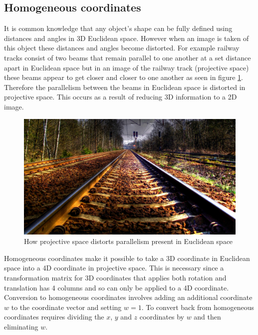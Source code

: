 \subsection{Homogeneous coordinates}
It is common knowledge that any object's shape can be fully defined using distances and angles in 3D Euclidean space. However when an image is taken of this object these distances and angles become distorted. For example railway tracks consist of two beams that remain parallel to one another at a set distance apart in Euclidean space but in an image of the railway track (projective space) these beams appear to get closer and closer to one another as seen in figure \ref{fig:traintrack}. Therefore the parallelism between the beams in Euclidean space is distorted in projective space. This occurs as a result of reducing 3D information to a 2D image. 

\begin{figure}[h]
    \centering
    \includegraphics[scale=0.1]{TrainTrack}
    \caption{How projective space distorts parallelism present in Euclidean space}
    \label{fig:traintrack}
\end{figure}

Homogeneous coordinates make it possible to take a 3D coordinate in Euclidean space into a 4D coordinate in projective space. This is necessary since a transformation matrix for 3D coordinates that applies both rotation and translation has 4 columns and so can only be applied to a 4D coordinate. Conversion to homogeneous coordinates involves adding an additional coordinate $w$ to the coordinate vector and setting $w=1$. To convert back from homogeneous coordinates requires dividing the $x$, $y$ and $z$ coordinates by $w$ and then eliminating $w$.


